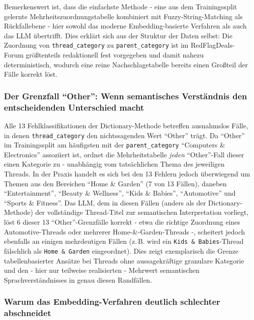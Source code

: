 Bemerkenswert ist, dass die einfachste Methode - eine aus dem Trainingssplit
gelernte Mehrheitszuordnungstabelle kombiniert mit Fuzzy-String-Matching als
Rückfallebene - hier sowohl das moderne Embedding-basierte Verfahren als auch
das LLM übertrifft. Dies erklärt sich aus der Struktur der Daten selbst: Die
Zuordnung von \texttt{thread\_category} zu \texttt{parent\_category} ist im
RedFlagDeals-Forum größtenteils redaktionell fest vorgegeben und damit nahezu
deterministisch, wodurch eine reine Nachschlagetabelle bereits einen Großteil
der Fälle korrekt löst.

\subsubsection{Der Grenzfall \enquote{Other}: Wenn semantisches Verständnis den entscheidenden Unterschied macht}

Alle 13 Fehlklassifikationen der Dictionary-Methode betreffen ausnahmslos
Fälle, in denen \texttt{thread\_category} den nichtssagenden Wert
\enquote{Other} trägt. Da \enquote{Other} im Trainingssplit am häufigsten mit
der \texttt{parent\_category} \enquote{Computers \& Electronics} assoziiert
ist, ordnet die Mehrheitstabelle \emph{jeden} \enquote{Other}-Fall dieser einen
Kategorie zu - unabhängig vom tatsächlichen Thema des jeweiligen Threads. In
der Praxis handelt es sich bei den 13 Fehlern jedoch überwiegend um Themen aus
den Bereichen \enquote{Home \& Garden} (7 von 13 Fällen), daneben
\enquote{Entertainment}, \enquote{Beauty \& Wellness}, \enquote{Kids \&
Babies}, \enquote{Automotive} und \enquote{Sports \& Fitness}. Das LLM, dem in
diesen Fällen (anders als der Dictionary-Methode) der vollständige Thread-Titel
zur semantischen Interpretation vorliegt, löst 6 dieser 13 \enquote{Other}-Grenzfälle
korrekt - etwa die richtige Zuordnung eines Automotive-Threads oder mehrerer
Home-\&-Garden-Threads -, scheitert jedoch ebenfalls an einigen mehrdeutigen
Fällen (z.\,B. wird ein \texttt{Kids \& Babies}-Thread fälschlich als
\texttt{Home \& Garden} eingeordnet). Dies zeigt exemplarisch die Grenze
tabellenbasierter Ansätze bei Threads ohne aussagekräftige granulare
Kategorie und den - hier nur teilweise realisierten - Mehrwert semantischen
Sprachverständnisses in genau diesen Randfällen.

\subsubsection{Warum das Embedding-Verfahren deutlich schlechter abschneidet}

